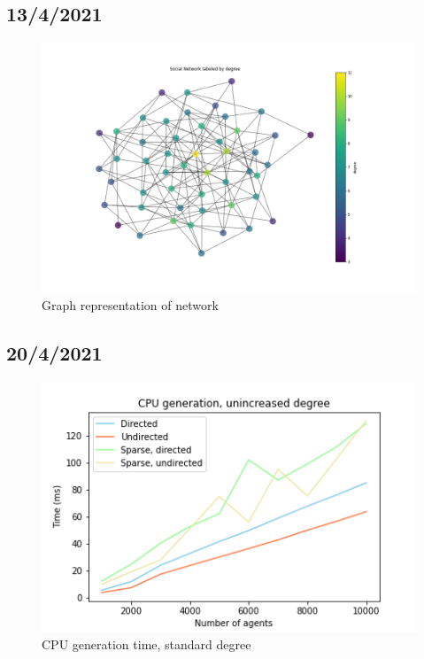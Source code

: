 \documentclass{article}
\begin{document}
\subsection{13/4/2021}
\begin{center}
    \begin{figure}[!htbp]
        \centering
        \includegraphics[width=1.3\textwidth]{ThesisKI/Images/DegreeGraph.png}
        \caption{Graph representation of network}
        \label{graph:degree}
    \end{figure}
\end{center}

\subsection{20/4/2021}
\begin{center}
    \begin{figure}[!htbp]
        \centering
        \includegraphics[width=.8\textwidth]{ThesisKI/Images/CPU.png}
        \caption{CPU generation time, standard degree}
        \label{CPU:standard}
    \end{figure}
\end{center}
\end{document}
